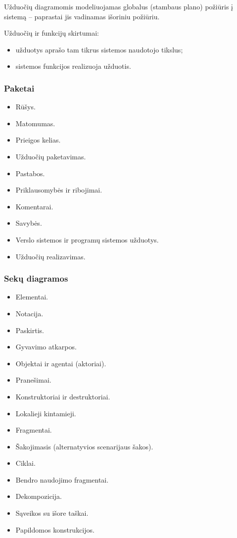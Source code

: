 Užduočių diagramomis modeliuojamas globalus (stambaus plano) požiūris
į sistemą – paprastai jis vadinamas išoriniu požiūriu.


Užduočių ir funkcijų skirtumai:
\begin{itemize}
  \item užduotys aprašo tam tikrus sistemos naudotojo tikslus;
  \item sistemos funkcijos realizuoja užduotis.
\end{itemize}


\subsubsection{Paketai}

\begin{itemize}
  \item Rūšys.
  \item Matomumas.
  \item Prieigos kelias.
  \item Užduočių paketavimas.
  \item Pastabos.
  \item Priklausomybės ir ribojimai.
  \item Komentarai.
  \item Savybės.
  \item Verslo sistemos ir programų sistemos užduotys.
  \item Užduočių realizavimas.
\end{itemize}

\subsubsection{Sekų diagramos}

\begin{itemize}
  \item Elementai.
  \item Notacija.
  \item Paskirtis.
  \item Gyvavimo atkarpos.
  \item Objektai ir agentai (aktoriai).
  \item Pranešimai.
  \item Konstruktoriai ir destruktoriai.
  \item Lokalieji kintamieji.
  \item Fragmentai.
  \item Šakojimasis (alternatyvios scenarijaus šakos).
  \item Ciklai.
  \item Bendro naudojimo fragmentai.
  \item Dekompozicija.
  \item Sąveikos su išore taškai.
  \item Papildomos konstrukcijos.
\end{itemize}

